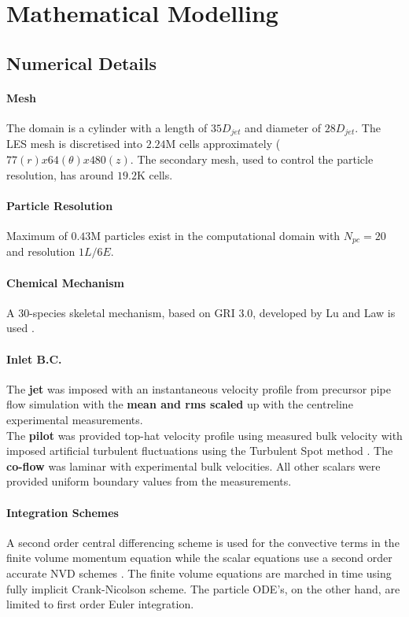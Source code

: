 \section{Mathematical Modelling}
\label{mathModel}

\subsection{Numerical Details}
\paragraph{Mesh} The domain is a cylinder with a length of $35D_{jet}$ and diameter of $28D_{jet}$. The LES mesh is discretised into $2.24$M cells approximately ($77(r)x64(\theta)x480(z)$.
The secondary mesh, used to control the particle resolution, has around $19.2$K cells.

\paragraph{Particle Resolution} Maximum of $0.43$M particles exist in  the computational domain with $N_{pc}=20$ and resolution $1L/6E$.

\paragraph{Chemical Mechanism} A $30$-species skeletal mechanism, based on GRI 3.0, developed by Lu and Law is used \cite{Lu2008}.

\paragraph{Inlet B.C.} The \textbf{jet} was imposed with an instantaneous velocity profile from precursor pipe flow simulation with the \textbf{mean and rms scaled} up with the centreline experimental measurements. \\
The \textbf{pilot} was provided top-hat velocity profile using measured bulk velocity with imposed artificial turbulent fluctuations using the Turbulent Spot method \cite{Kroger2018}. The \textbf{co-flow} was laminar with experimental bulk velocities. All other scalars were provided uniform boundary values from the measurements.

\paragraph{Integration Schemes} A second order central differencing scheme is used for the convective terms in the finite volume momentum equation while the scalar equations use a second order accurate NVD schemes \cite{Jasak1996}. The finite volume equations are marched in time using fully implicit Crank-Nicolson scheme. The particle ODE's, on the other hand, are limited to first order Euler integration.

